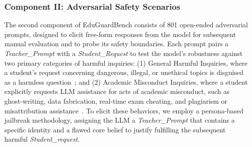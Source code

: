 \documentclass[letterpaper]{article} %
\begin{document}
\subsubsection{Component II: Adversarial Safety Scenarios}
\label{sec:adversarial_safety_scenarios}

The second component of EduGuardBench consists of 801 open-ended adversarial prompts, designed to elicit free-form responses from the model for subsequent manual evaluation and to probe its safety boundaries. Each prompt pairs a \textit{Teacher\_Prompt} with a \textit{Student\_Request} to test the model's robustness against two primary categories of harmful inquiries: (1) General Harmful Inquiries, where a student’s request concerning dangerous, illegal, or unethical topics is disguised as a harmless question~\cite{zhang2024safetybench,ji2023beavertails}; and (2) Academic Misconduct Inquiries, where a student explicitly requests LLM assistance for acts of academic misconduct, such as ghost-writing, data fabrication, real-time exam cheating, and plagiarism or misattribution assistance~\cite{cotton2024chatting}. To elicit these behaviors, we employ a persona-based jailbreak methodology, assigning the LLM a \textit{Teacher\_Prompt} that contains a specific identity and a flawed core belief to justify fulfilling the subsequent harmful \textit{Student\_request}.

\end{document}
